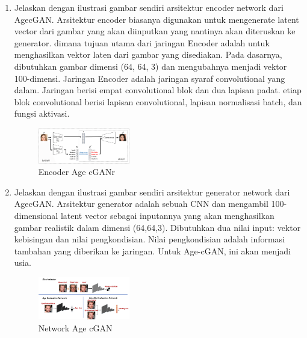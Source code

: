 \begin{enumerate}
        \item Jelaskan dengan ilustrasi gambar sendiri arsitektur encoder network dari AgecGAN.
		Arsitektur encoder biasanya digunakan untuk mengenerate latent vector dari gambar yang akan diinputkan yang nantinya akan diteruskan 
        ke generator. dimana tujuan utama dari jaringan Encoder adalah untuk menghasilkan vektor laten dari gambar yang disediakan. 
        Pada dasarnya, dibutuhkan gambar dimensi (64, 64, 3) dan mengubahnya menjadi vektor 100-dimensi. 
        Jaringan Encoder adalah jaringan syaraf convolutional yang dalam. Jaringan berisi empat convolutional blok dan dua lapisan padat. 
        etiap blok convolutional berisi lapisan convolutional, lapisan normalisasi batch, dan fungsi aktivasi.

            \begin{figure}[H]
                \includegraphics[width=4cm]{figures/1174012/chapter9/teori3.png}
                    \centering
                \caption{Encoder Age cGANr}
            \end{figure}

        \item Jelaskan dengan ilustrasi gambar sendiri arsitektur generator network dari AgecGAN.
		Arsitektur generator adalah sebuah CNN dan mengambil 100-dimensional latent vector sebagai inputannya yang akan menghasilkan 
        gambar realistik dalam dimensi (64,64,3). Dibutuhkan dua nilai input: vektor kebisingan dan nilai pengkondisian. 
        Nilai pengkondisian adalah informasi tambahan yang diberikan ke jaringan. Untuk Age-cGAN, ini akan menjadi usia. 
		\begin{figure}[H]
			\includegraphics[width=4cm]{figures/1174012/chapter9/teori4.jpg}
            	\centering
           	\caption{Network Age cGAN}
       	\end{figure} 
 

\end{enumerate}
